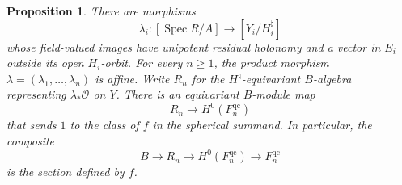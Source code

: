 \documentclass[11pt]{article}
\numberwithin{equation}{section}
\newtheorem{proposition}[theorem]{Proposition}
\theoremstyle{definition}
\theoremstyle{remark}
\newcommand{\cO}{\mathcal O}
\newcommand{\Spec}{\operatorname{Spec}}
\begin{document}
\begin{proposition}\label{boundary:cyclic-module}
There are morphisms
\begin{equation}\label{boundary:evaluation}
 \lambda_i:[\Spec R/A]\longrightarrow[Y_i/H_i^\natural]
\end{equation}
whose field-valued images have unipotent residual holonomy and a vector
in $E_i$ outside its open $H_i$-orbit.  For every $n\geq1$, the product
morphism $\lambda=(\lambda_1,\ldots,\lambda_n)$ is affine.  Write $R_n$
for the $H^\natural$-equivariant $B$-algebra representing
$\lambda_*\cO$ on $Y$.  There is an equivariant $B$-module map
\begin{equation}\label{eq:cyclic-module-map}
 R_n\longrightarrow H^0(F_n^{\mathrm{qc}})
\end{equation}
that sends $1$ to the class of $f$ in the spherical summand.  In
particular, the composite
\begin{equation}\label{boundary:section-f}
 B\longrightarrow R_n\longrightarrow H^0(F_n^{\mathrm{qc}})
       \longrightarrow F_n^{\mathrm{qc}}
\end{equation}
is the section defined by $f$.
\end{proposition}
\end{document}
